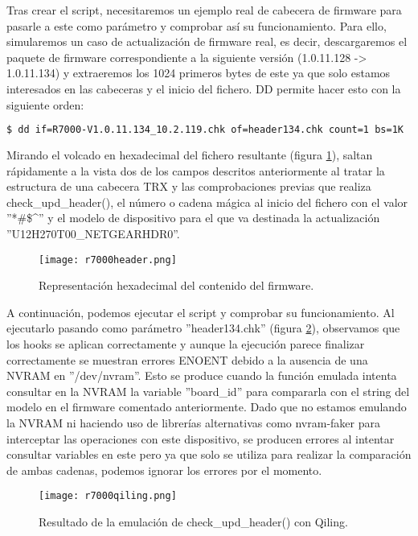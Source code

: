 Tras crear el script, necesitaremos un ejemplo real de cabecera de firmware para pasarle a este como parámetro y comprobar así
su funcionamiento. Para ello, simularemos un caso de actualización de firmware real, es decir, descargaremos el paquete de 
firmware correspondiente a la siguiente versión (1.0.11.128 -> 1.0.11.134) y extraeremos los 1024 primeros bytes de este ya que 
solo estamos interesados en las cabeceras y el inicio del fichero. DD permite hacer esto con la siguiente orden:

\begin{lstlisting}[language=bash, breaklines]
    $ dd if=R7000-V1.0.11.134_10.2.119.chk of=header134.chk count=1 bs=1K
\end{lstlisting}

Mirando el volcado en hexadecimal del fichero resultante (figura \ref{fig:R7000header}), saltan rápidamente a la vista dos de
los campos descritos anteriormente al tratar la estructura de una cabecera TRX y las comprobaciones previas que realiza 
check\_upd\_header(), el número o cadena mágica al inicio del fichero con el valor ''*\#\$\textasciicircum'' y el modelo de dispositivo
para el que va destinada la actualización ''U12H270T00\_NETGEARHDR0''.

\begin{figure}[H]
    \centering
    \texttt{[image: r7000header.png]}
    \caption{Representación hexadecimal del contenido del firmware.}
    \label{fig:R7000header}
\end{figure}

A continuación, podemos ejecutar el script y comprobar su funcionamiento. Al ejecutarlo pasando como parámetro 
''header134.chk'' (figura \ref{fig:R7000qiling}), observamos que los hooks se aplican correctamente y aunque la ejecución 
parece finalizar correctamente se muestran errores ENOENT debido a la ausencia de una NVRAM en ''/dev/nvram''. Esto se produce cuando la función emulada
intenta consultar en la NVRAM la variable ''board\_id'' para compararla con el string del modelo en el firmware comentado
anteriormente. Dado que no estamos emulando la NVRAM ni haciendo uso de librerías alternativas como nvram-faker\cite{nvram}
para interceptar las operaciones con este dispositivo, se producen errores al intentar consultar variables en este pero ya
que solo se utiliza para realizar la comparación de ambas cadenas, podemos ignorar los errores por el momento.

\begin{figure}[H]
    \centering
    \texttt{[image: r7000qiling.png]}
    \caption{Resultado de la emulación de check\_upd\_header() con Qiling.}
    \label{fig:R7000qiling}
\end{figure}

